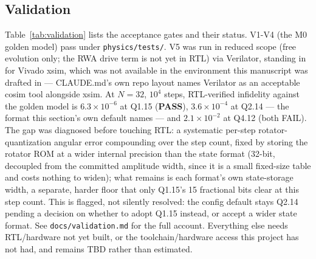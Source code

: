 \documentclass[smallextended]{svjour3}
\begin{document}

\subsection{Validation}

Table~\ref{tab:validation} lists the acceptance gates and their status. V1-V4 (the M0
golden model) pass under \texttt{physics/tests/}. V5 was run in reduced scope (free
evolution only; the RWA drive term is not yet in RTL) via Verilator, standing in for
Vivado xsim, which was not available in the environment this manuscript was drafted in
--- CLAUDE.md's own repo layout names Verilator as an acceptable cosim tool alongside
xsim. At $N=32$, $10^4$ steps, RTL-verified infidelity against the golden model is
$6.3\times10^{-6}$ at Q1.15 (\textbf{PASS}), $3.6\times10^{-4}$ at Q2.14 --- the format
this section's own default names --- and $2.1\times10^{-2}$ at Q4.12 (both FAIL). The
gap was diagnosed before touching RTL: a systematic per-step rotator-quantization
angular error compounding over the step count, fixed by storing the rotator ROM at a
wider internal precision than the state format (32-bit, decoupled from the committed
amplitude width, since it is a small fixed-size table and costs nothing to widen); what
remains is each format's own state-storage width, a separate, harder floor that only
Q1.15's 15 fractional bits clear at this step count. This is flagged, not silently
resolved: the config default stays Q2.14 pending a decision on whether to adopt Q1.15
instead, or accept a wider state format. See \texttt{docs/validation.md} for the full
account. Everything else needs RTL/hardware not yet built, or the toolchain/hardware
access this project has not had, and remains TBD rather than estimated.
\end{document}

